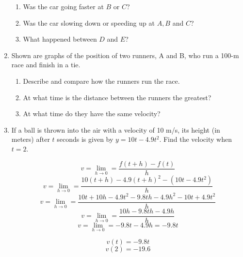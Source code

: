 \documentclass{article}
\begin{document}
\begin{enumerate}
\begin{enumerate}
			\item Was the car going faster at $B$ or $C$?

			\item Was the car slowing down or speeding up at $A,B$ and $C$?

			\item What happened between $D$ and $E$?
		\end{enumerate}
		\item Shown are graphs of the position of two runners, A and B, who run a
			100-m race and finish in a tie.

		\begin{enumerate}
			\item Describe and compare how the runners run the race.

			\item At what time is the distance between the runners the greatest?

			\item At what time do they have the same velocity?
		\end{enumerate}

		\item If a ball is thrown into the air with a velocity of 10 m/s, its height
			(in meters) after $t$ seconds is given by $y = 10t - 4.9t^2$. Find the
			velocity when $t = 2$.

			$$v = \lim \limits _{h \to 0} = \frac{f(t+h) - f(t)}{h}$$
			$$v = \lim \limits _{h \to 0} = \frac{10(t+h) - 4.9(t+h)^2 - (10t - 4.9t^2)}{h}$$
			$$v = \lim \limits _{h \to 0} = \frac{10t + 10h - 4.9t^2 - 9.8th - 4.9h^2 - 10t + 4.9t^2}{h}$$
			$$v = \lim \limits _{h \to 0} = \frac{10h - 9.8th - 4.9h}{h}$$
			$$v = \lim \limits _{h \to 0} = -9.8t - 4.9 h = -9.8t$$

			$$v(t) = -9.8t$$
			$$v(2) = -19.6$$
	\end{enumerate}
\end{document}
